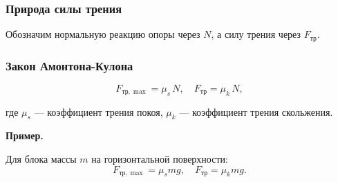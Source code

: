 \documentclass[12pt, a4paper]{article}
\begin{document}
\subsubsection*{Природа силы трения}

Обозначим нормальную реакцию опоры через $N$, а силу трения через $F_{\mathrm{тр}}$.

\subsubsection*{Закон Амонтона-Кулона}

\[
F_{\mathrm{тр},\max} = \mu_s\,N,
\quad
F_{\mathrm{тр}} = \mu_k\,N,
\]

где $\mu_s$ — коэффициент трения покоя, $\mu_k$ — коэффициент трения скольжения.

\textbf{Пример.}

Для блока массы $m$ на горизонтальной поверхности:
\[
F_{\mathrm{тр},\max} = \mu_s mg,
\quad
F_{\mathrm{тр}} = \mu_k mg.
\]
\end{document}
